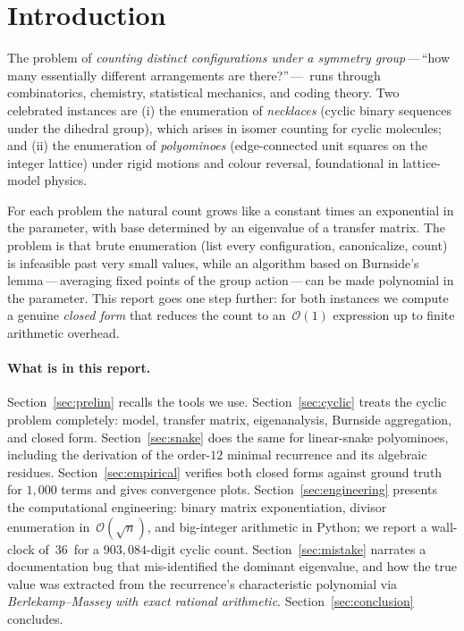 \documentclass[11pt,a4paper]{article}
\newcommand{\SI}[2]{#1\,#2}
\newcommand{\milli}[0]{\text{m}}
\newcommand{\second}[0]{\text{s}}
\theoremstyle{definition}
\theoremstyle{plain}
\newcommand{\bigo}{\mathcal{O}}
\begin{document}
\tableofcontents
\newpage

\section{Introduction}
\label{sec:intro}

The problem of \emph{counting distinct configurations under a symmetry
group}\,---\,``how many essentially different arrangements are there?''\,---\,
runs through combinatorics, chemistry, statistical mechanics, and coding
theory.  Two celebrated instances are (i) the enumeration of \emph{necklaces}
(cyclic binary sequences under the dihedral group), which arises in
isomer counting for cyclic molecules; and (ii) the enumeration of
\emph{polyominoes} (edge-connected unit squares on the integer lattice)
under rigid motions and colour reversal, foundational in
lattice-model physics.

For each problem the natural count grows like a constant times an
exponential in the parameter, with base determined by an eigenvalue of a
transfer matrix.  The problem is that brute enumeration (list every
configuration, canonicalize, count) is infeasible past very small values,
while an algorithm based on Burnside's lemma\,---\,averaging fixed points
of the group action\,---\,can be made polynomial in the parameter.
This report goes one step further: for both instances we compute a genuine
\emph{closed form} that reduces the count to an~$\bigo(1)$ expression up to
finite arithmetic overhead.

\paragraph{What is in this report.} Section~\ref{sec:prelim} recalls the
tools we use.  Section~\ref{sec:cyclic} treats the cyclic problem
completely: model, transfer matrix, eigenanalysis, Burnside aggregation,
and closed form.  Section~\ref{sec:snake} does the same for linear-snake
polyominoes, including the derivation of the order-$12$ minimal recurrence
and its algebraic residues.  Section~\ref{sec:empirical} verifies both
closed forms against ground truth for $1{,}000$ terms and gives
convergence plots.  Section~\ref{sec:engineering} presents the
computational engineering: binary matrix exponentiation, divisor
enumeration in~$\bigo(\sqrt n)$, and big-integer arithmetic in Python;
we report a wall-clock of~\SI{36}{\milli\second} for a $903{,}084$-digit
cyclic count.  Section~\ref{sec:mistake} narrates a documentation bug that
mis-identified the dominant eigenvalue, and how the true value was
extracted from the recurrence's characteristic polynomial via
\emph{Berlekamp--Massey with exact rational arithmetic}.
Section~\ref{sec:conclusion} concludes.
\end{document}
